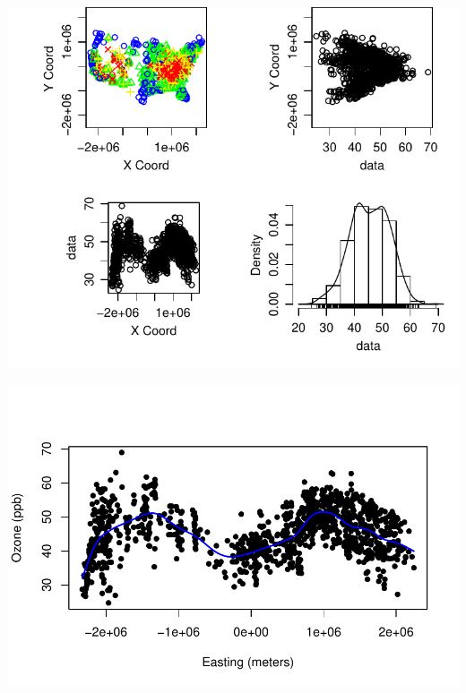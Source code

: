 \documentclass[letterpaper, 12pt]{article}\usepackage[]{graphicx}\usepackage[]{color}
\makeatletter
\def\maxwidth{ %
  \ifdim\Gin@nat@width>\linewidth
    \linewidth
  \else
    \Gin@nat@width
  \fi
}
\newenvironment{knitrout}{}{} %
\makeatother
\begin{document}
\begin{enumerate}[a.]
\begin{knitrout}
\color{fgcolor}
\includegraphics[width=\maxwidth]{figure/twoxtwo} 

\end{knitrout}


\begin{knitrout}
\color{fgcolor}
\includegraphics[width=\maxwidth]{figure/xcoord} 

\end{knitrout}



\end{enumerate}
\end{document}
